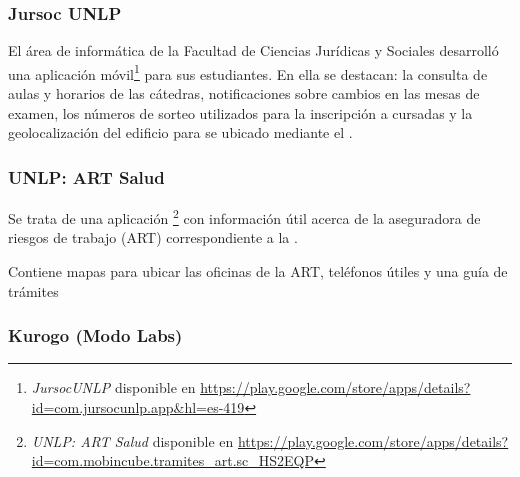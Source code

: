 \subsubsection{Jursoc UNLP}
\label{aplicaciones_existentes_unlp_jursoc}


El área de informática de la Facultad de Ciencias Jurídicas y Sociales desarrolló una aplicación móvil\footnote{ \textit{JursocUNLP} disponible en \url{https://play.google.com/store/apps/details?id=com.jursocunlp.app&hl=es-419} } para sus estudiantes. En ella se destacan: la consulta de aulas y horarios de las cátedras, notificaciones sobre cambios en las mesas de examen, los números de sorteo utilizados para la inscripción a cursadas y la geolocalización del edificio para se ubicado mediante el .


\subsubsection{UNLP: ART Salud}
\label{aplicaciones_existentes_unlp_art_salud}


Se trata de una aplicación \footnote{ \textit{UNLP: ART Salud} disponible en \url{https://play.google.com/store/apps/details?id=com.mobincube.tramites_art.sc_HS2EQP}} con información útil acerca de la aseguradora de riesgos de trabajo (ART) correspondiente a la \unlp. 

Contiene mapas para ubicar las oficinas de la ART, teléfonos útiles y una guía de trámites

\subsubsection{Kurogo (Modo Labs)}
\label{aplicaciones_existentes_kurogo}


